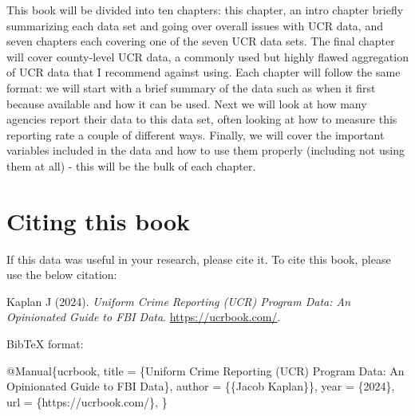 \documentclass[
]{krantz}
\makeatletter
\newenvironment{Shaded}{\begin{snugshade}}{\end{snugshade}}
\newcommand{\DataTypeTok}[1]{\textcolor[rgb]{0.27,0.27,0.27}{#1}}
\newcommand{\NormalTok}[1]{#1}
\newcommand{\OtherTok}[1]{\textcolor[rgb]{0.37,0.37,0.37}{#1}}
\newcommand{\VariableTok}[1]{\textcolor[rgb]{0,0,0}{#1}}
\newenvironment{kframe}{%
\medskip{}
\setlength{\fboxsep}{.8em}
 \def\at@end@of@kframe{}%
 \ifinner\ifhmode%
  \def\at@end@of@kframe{\end{minipage}}%
  \begin{minipage}{\columnwidth}%
 \fi\fi%
 \def\FrameCommand##1{\hskip\@totalleftmargin \hskip-\fboxsep
 \colorbox{shadecolor}{##1}\hskip-\fboxsep
     \hskip-\linewidth \hskip-\@totalleftmargin \hskip\columnwidth}%
 \MakeFramed {\advance\hsize-\width
   \@totalleftmargin\z@ \linewidth\hsize
   \@setminipage}}%
 {\par\unskip\endMakeFramed%
 \at@end@of@kframe}
\renewenvironment{Shaded}{\begin{kframe}}{\end{kframe}}
\makeatother
\begin{document}
This book will be divided into ten chapters: this chapter,
an intro chapter briefly summarizing each data set and going
over overall issues with UCR data, and seven chapters each
covering one of the seven UCR data sets. The final chapter
will cover county-level UCR data, a commonly used but highly
flawed aggregation of UCR data that I recommend against
using. Each chapter will follow the same format: we will
start with a brief summary of the data such as when it first
because available and how it can be used. Next we will look
at how many agencies report their data to this data set,
often looking at how to measure this reporting rate a couple
of different ways. Finally, we will cover the important
variables included in the data and how to use them properly
(including not using them at all) - this will be the bulk of
each chapter.

\section{Citing this book}\label{citing-this-book}

If this data was useful in your research, please cite it. To
cite this book, please use the below citation:

Kaplan J (2024). \emph{Uniform Crime Reporting (UCR) Program
Data: An Opinionated Guide to FBI Data}.
\url{https://ucrbook.com/}.

BibTeX format:

\begin{Shaded}
\begin{Highlighting}[]
\VariableTok{@Manual}\NormalTok{\{}\OtherTok{ucrbook}\NormalTok{,}
  \DataTypeTok{title}\NormalTok{ = \{Uniform Crime Reporting (UCR) Program Data: An Opinionated Guide to FBI Data\},}
  \DataTypeTok{author}\NormalTok{ = \{\{Jacob Kaplan\}\},}
  \DataTypeTok{year}\NormalTok{ = \{2024\},}
  \DataTypeTok{url}\NormalTok{ = \{https://ucrbook.com/\},}
\NormalTok{\}}
\end{Highlighting}
\end{Shaded}
\end{document}
